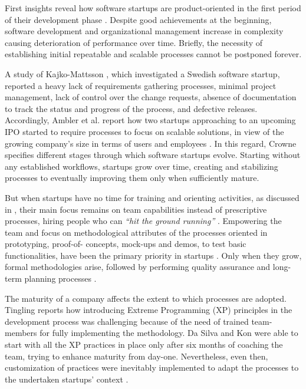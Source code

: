 \documentclass[12pt,journal,compsoc]{../sty/IEEEtran}
\begin{document}
First insights reveal how software startups are product-oriented in the first
period of their development phase \cite{Heitlager2007}. Despite good
achievements at the beginning, software development and organizational
management increase in complexity \cite{1456074,Banker1998} causing
deterioration of performance over time. Briefly, the necessity of establishing
initial repeatable and scalable processes cannot be postponed forever.

A study of Kajko-Mattsson \cite{Kajko-Mattsson2008}, which investigated a
Swedish software startup, reported a heavy lack of requirements gathering
processes, minimal project management, lack of control over the change requests,
absence of documentation to track the status and progress of the process, and
defective releases. Accordingly, Ambler et al. report how two startups
approaching to an upcoming IPO started to require processes to focus on scalable
solutions, in view of the growing company's size in terms of users and employees
\cite{Ambler2002}. In this regard, Crowne \cite{Crowne2002} specifies different
stages through which software startups evolve. Starting without any established
workflows, startups grow over time, creating and stabilizing processes to
eventually improving them only when sufficiently mature.

But when startups have no time for training and orienting activities, as
discussed in \cite{Sutton2000}, their main focus remains on team capabilities
instead of prescriptive processes, hiring people who can \textit{``hit the
ground running''} \cite{Yoffie1999}. Empowering the team and focus on
methodological attributes of the processes oriented in prototyping,  proof-of-
concepts, mock-ups and demos, to test basic functionalities, have been  the
primary priority in startups \cite{Camel1994a}. Only when they grow, formal
methodologies arise, followed by performing quality assurance and long-term
planning processes \cite{Yoffie1999}.

The maturity of a company affects the extent to which processes are adopted.
Tingling \cite{Tingling2007} reports how introducing Extreme Programming (XP)
principles \cite{Beck:2004:EPE:1076267} in the development process was
challenging because of the need of trained team-members for fully implementing
the methodology. Da Silva and Kon \cite{Silva2005} were able to start with all
the XP practices in place only after six months of coaching the team, trying to
enhance maturity from day-one. Nevertheless, even then, customization of
practices were inevitably implemented to adapt the processes to the undertaken
startups' context \cite{Deias}.
\end{document}
